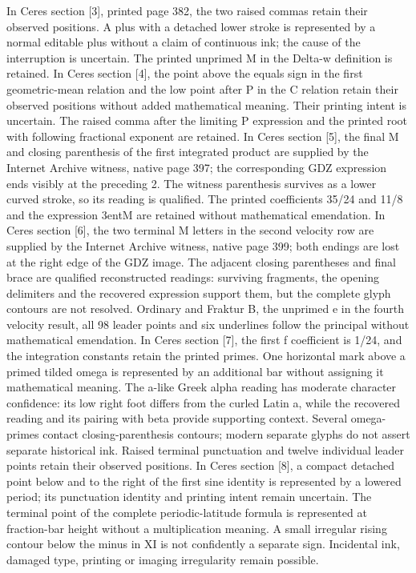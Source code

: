 In Ceres section [3], printed page 382, the two raised commas retain their observed positions. A plus with a detached lower stroke is represented by a normal editable plus without a claim of continuous ink; the cause of the interruption is uncertain. The printed unprimed M in the Delta-w definition is retained.
 In Ceres section [4], the point above the equals sign in the first geometric-mean relation and the low point after P in the C relation retain their observed positions without added mathematical meaning. Their printing intent is uncertain. The raised comma after the limiting P expression and the printed root with following fractional exponent are retained.
 In Ceres section [5], the final M and closing parenthesis of the first integrated product are supplied by the Internet Archive witness, native page 397; the corresponding GDZ expression ends visibly at the preceding 2. The witness parenthesis survives as a lower curved stroke, so its reading is qualified. The printed coefficients 35/24 and 11/8 and the expression 3entM are retained without mathematical emendation.
 In Ceres section [6], the two terminal M letters in the second velocity row are supplied by the Internet Archive witness, native page 399; both endings are lost at the right edge of the GDZ image. The adjacent closing parentheses and final brace are qualified reconstructed readings: surviving fragments, the opening delimiters and the recovered expression support them, but the complete glyph contours are not resolved. Ordinary and Fraktur B, the unprimed e in the fourth velocity result, all 98 leader points and six underlines follow the principal without mathematical emendation.
 In Ceres section [7], the first f coefficient is 1/24, and the integration constants retain the printed primes. One horizontal mark above a primed tilded omega is represented by an additional bar without assigning it mathematical meaning. The a-like Greek alpha reading has moderate character confidence: its low right foot differs from the curled Latin a, while the recovered reading and its pairing with beta provide supporting context. Several omega-primes contact closing-parenthesis contours; modern separate glyphs do not assert separate historical ink. Raised terminal punctuation and twelve individual leader points retain their observed positions.
 In Ceres section [8], a compact detached point below and to the right of the first sine identity is represented by a lowered period; its punctuation identity and printing intent remain uncertain. The terminal point of the complete periodic-latitude formula is represented at fraction-bar height without a multiplication meaning. A small irregular rising contour below the minus in XI is not confidently a separate sign. Incidental ink, damaged type, printing or imaging irregularity remain possible.
